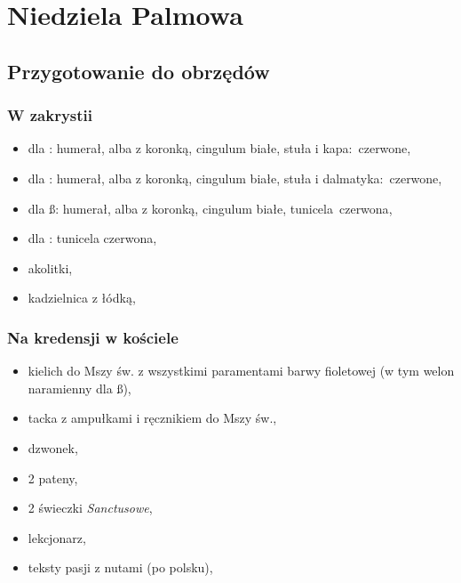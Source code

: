 \chapter{Niedziela Palmowa}

\section{Przygotowanie do obrzędów}

\subsection{W zakrystii}

\begin{itemize}
	\item dla \ii: humerał, alba z koronką, cingulum białe, stuła i
	      kapa: {\color{red}czerwone},
	\item dla \dd: humerał, alba z koronką, cingulum białe, stuła i
	      dalmatyka: {\color{red}czerwone},
	\item dla \ss: humerał, alba z koronką, cingulum białe,
	      tunicela {\color{red}czerwona},
	\item dla : tunicela {\color{red}czerwona},
	\item akolitki,
	\item kadzielnica z łódką,
\end{itemize}

\subsection{Na kredensji w kościele}

\begin{itemize}
	\item kielich do Mszy św. z wszystkimi paramentami barwy
		      {\color{violet}fioletowej} (w tym welon naramienny dla \ss),
	\item tacka z ampułkami i ręcznikiem do Mszy św.,
	\item dzwonek,
	\item 2 pateny,
	\item 2 świeczki \textit{Sanctusowe},
	\item lekcjonarz,
	\item teksty pasji z nutami (po polsku),
\end{itemize}


